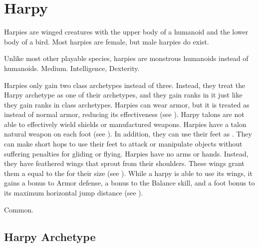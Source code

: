 \section{Harpy}
  Harpies are winged creatures with the upper body of a humanoid and the lower body of a bird.
  Most harpies are female, but male harpies do exist.

   Unlike most other playable species, harpies are monstrous humanoids instead of humanoids.
   Medium.
    Intelligence,  Dexterity.
  \begin{itemize}
     Harpies only gain two class archetypes instead of three.
      Instead, they treat the Harpy archetype as one of their archetypes, and they gain ranks in it just like they gain ranks in class archetypes.
     Harpies can wear armor, but it is treated as  instead of normal armor, reducing its effectiveness (see ).
      Harpy talons are not able to effectively wield shields or manufactured weapons.
     Harpies have a talon natural weapon on each foot (see ).
      In addition, they can use their feet as .
      They can make short hops to use their feet to attack or manipulate objects without suffering penalties for gliding or flying.
     Harpies have no arms or hands.
      Instead, they have feathered wings that sprout from their shoulders.
      These wings grant them a  equal to the  for their size (see ).
     While a harpy is able to use its wings, it gains a  bonus to Armor defense, a  bonus to the Balance skill, and a  foot bonus to its maximum horizontal jump distance (see ).
  \end{itemize}
   Common.

  \subsection{Harpy Archetype}

